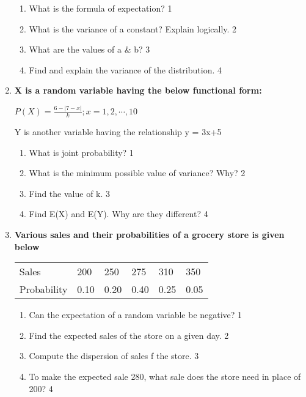 \documentclass[a4paper,oneside, margin=1.4in]{book}
\begin{document}
\begin{enumerate}
  \begin{enumerate}
    \item
	What is the formula of expectation? \hfill 1
    \item
	What is the variance of a constant? Explain logically. \hfill 2
    \item  
	What are the values of a \& b? \hfill 3
    \item
	Find and explain the variance of the distribution. \hfill 4
  \end{enumerate}
  
       \item
	  \textbf{X is a random variable having the below functional form:} 
  
  \begin{center}
  $P(X) = \frac{6-|7-x|}{k}; x = 1, 2, \cdots,10$ \\
  \end{center}  
  
  Y is another variable having the relationship y = 3x+5
  
  \begin{enumerate}
    \item
	What is joint probability? \hfill 1
    \item
	What is the minimum possible value of variance? Why? \hfill 2
    \item  
	Find the value of k. \hfill 3
    \item
	Find E(X) and E(Y). Why are they different? \hfill 4
  \end{enumerate}
  
       \item
  \textbf{Various sales and their probabilities of a grocery store is given below}
  
  \begin{table}[h]
  \centering
\begin{tabular}{llllll}
Sales & 200 & 250 & 275 & 310 & 350 \\
Probability & 0.10 & 0.20 & 0.40 & 0.25 & 0.05
\end{tabular}
\end{table}

  \begin{enumerate}
    \item
	Can the expectation of a random variable be negative? \hfill 1
    \item
    	Find the expected sales of the store on a given day. \hfill 2
    \item
    	Compute the dispersion of sales f the store. \hfill 3
     \item
     	To make the expected sale 280, what sale does the store need in place of 200? \hfill 4
  \end{enumerate}
  

\end{enumerate}
\end{document}
